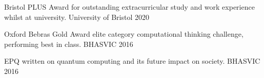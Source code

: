 \vspace{-0.1cm}

\begin{cvhonors}

  \cvhonor
    {Bristol PLUS Award} %
    {for outstanding extracurricular study and work experience whilst at university.} %
    {University of Bristol} %
    {2020} %

  \cvhonor
    {Oxford Bebras Gold Award} %
    {elite category computational thinking challenge, performing best in class.} %
    {BHASVIC} %
    {2016} %

  \cvhonor
    {EPQ} %
    {written on quantum computing and its future impact on society.} %
    {BHASVIC} %
    {2016} %
    

\end{cvhonors}
